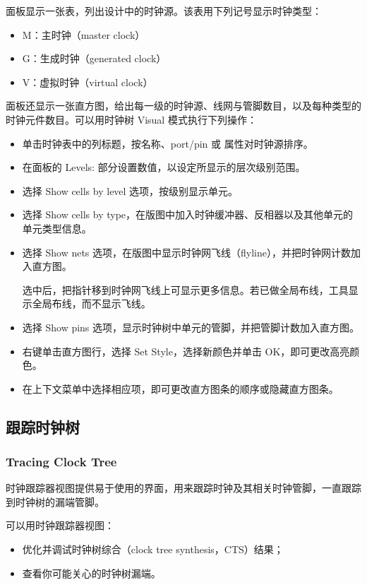 面板显示一张表，列出设计中的时钟源。该表用下列记号显示时钟类型：
\begin{itemize}
  \item M：主时钟（master clock）
  \item G：生成时钟（generated clock）
  \item V：虚拟时钟（virtual clock）
\end{itemize}

面板还显示一张直方图，给出每一级的时钟源、线网与管脚数目，以及每种类型的时钟元件数目。可以用时钟树 Visual 模式执行下列操作：
\begin{itemize}
  \item 单击时钟表中的列标题，按名称、port/pin 或  属性对时钟源排序。
  \item 在面板的 Levels: 部分设置数值，以设定所显示的层次级别范围。
  \item 选择 Show cells by level 选项，按级别显示单元。
  \item 选择 Show cells by type，在版图中加入时钟缓冲器、反相器以及其他单元的单元类型信息。
  \item 选择 Show nets 选项，在版图中显示时钟网飞线（flyline），并把时钟网计数加入直方图。

  选中后，把指针移到时钟网飞线上可显示更多信息。若已做全局布线，工具显示全局布线，而不显示飞线。
  \item 选择 Show pins 选项，显示时钟树中单元的管脚，并把管脚计数加入直方图。
  \item 右键单击直方图行，选择 Set Style，选择新颜色并单击 OK，即可更改高亮颜色。
  \item 在上下文菜单中选择相应项，即可更改直方图条的顺序或隐藏直方图条。
\end{itemize}

\subsection{跟踪时钟树}
\subsubsection*{Tracing Clock Tree}

时钟跟踪器视图提供易于使用的界面，用来跟踪时钟及其相关时钟管脚，一直跟踪到时钟树的漏端管脚。

可以用时钟跟踪器视图：
\begin{itemize}
  \item 优化并调试时钟树综合（clock tree synthesis，CTS）结果；
  \item 查看你可能关心的时钟树漏端。
\end{itemize}


